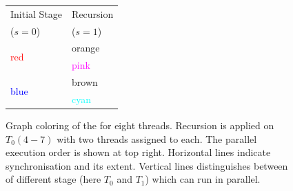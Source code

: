 \begin{figure}[H]
\begin{minipage}[c]{0.4\textwidth}
	       	\begin{tabular}{l|l}
	       		{Initial Stage} & {Recursion}\\
	       		{($s=0$)} & {($s=1$)}\\
	       		\midrule
	       	   \multirow{2}{*}{\textcolor{red}{red}} & {\textcolor{amber}{orange}}\\
	       	   \cmidrule(lr){2-2}
	       		& {\textcolor{magenta}{pink}}\\
	       		\midrule
	       	   \multirow{2}{*}{\textcolor{blue}{blue}} & {\textcolor{carmine}{brown}}\\
	       	   \cmidrule(lr){2-2}
	       	   & {\textcolor{cyan}{cyan}}\\
	       	   \bottomrule
	       	\end{tabular}
       		\caption{Graph coloring of the \stex for eight threads. Recursion is applied on \levelGroups $T_0(4-7)$ with two threads assigned to each. The parallel execution order is shown at top right.  Horizontal lines indicate synchronisation and its extent. Vertical lines distinguishes between \levelGroups of different stage (here $T_0$ and $T_1$) which can run in parallel. 
		}
       		\label{fig:rec_2d-7pt_graph}
       	\end{minipage}
       \end{figure}
     
          
